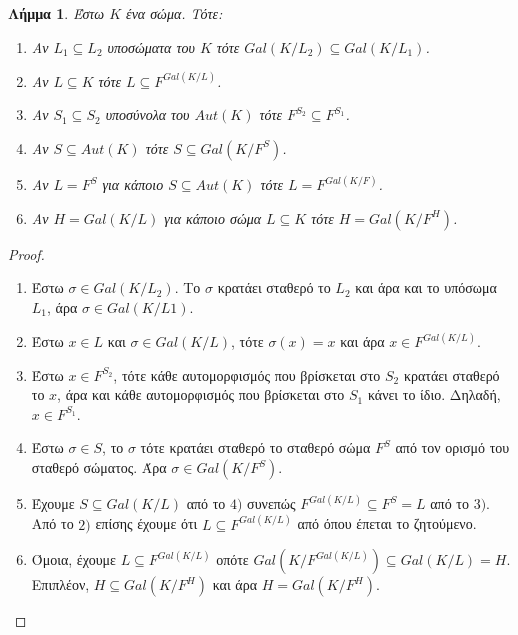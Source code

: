 \documentclass[oneside,a4paper]{article}
\newtheorem{lemma}{Λήμμα}
\begin{document}
\begin{lemma}
	\label{duo ennia}
	Έστω $K$ ένα σώμα. Τότε:
	\begin{enumerate}
		\item Αν $L_1 \subseteq L_2$ υποσώματα του $K$ τότε $Gal(K/L_2) \subseteq Gal(K/L_1)$.
		\item Αν $L\subseteq K$ τότε $L \subseteq F^{Gal(K/L)}$.
		\item Αν $S_1 \subseteq S_2$ υποσύνολα του $Aut(K)$ τότε $F^{S_2} \subseteq F^{S_1}$.
		\item Αν $S \subseteq Aut(K)$ τότε $S\subseteq Gal(K/F^S)$.
		\item Αν $L = F^S$ για κάποιο $S\subseteq Aut(K)$ τότε $L = F^{Gal(K/F)}$.
		\item Αν $H = Gal(K/L)$ για κάποιο σώμα $L \subseteq K$ τότε $H = Gal(K/F^H)$.
	\end{enumerate}
\end{lemma}
\begin{proof} $ $
	\begin{enumerate}
		\item Έστω $\sigma \in Gal(K/L_2)$. Το $\sigma$ κρατάει σταθερό το $L_2$ και άρα και το υπόσωμα $L_1$, άρα $\sigma \in Gal(K/L1)$.
		\item Έστω $x \in L$ και $\sigma \in Gal(K/L)$, τότε $\sigma (x) = x$ και άρα $x \in F^{Gal(K/L)}$.
		\item Έστω $x \in F^{S_2}$, τότε κάθε αυτομορφισμός που βρίσκεται στο $S_2$ κρατάει σταθερό το $x$, άρα και κάθε αυτομορφισμός που βρίσκεται στο $S_1$ κάνει το ίδιο. Δηλαδή, $x \in F^{S_1}$.
		\item Έστω $\sigma \in S$, το $\sigma$ τότε κρατάει σταθερό το σταθερό σώμα $F^S$ από τον ορισμό του σταθερό σώματος. Άρα $\sigma \in Gal(K/F^S)$.
		\item Έχουμε $S \subseteq Gal(K/L)$ από το $4)$ συνεπώς $F^{Gal(K/L)} \subseteq F^S = L$ από το $3)$. Από το $2)$ επίσης έχουμε ότι $L\subseteq F^{Gal(K/L)}$ από όπου έπεται το ζητούμενο.
		\item Όμοια, έχουμε $L \subseteq F^{Gal(K/L)}$ οπότε $Gal(K/F^{Gal(K/L)}) \subseteq Gal(K/L) = H$. Επιπλέον, $H \subseteq Gal(K/F^H)$ και άρα $H = Gal(K/F^H)$.
	\end{enumerate}
\end{proof}
\end{document}
